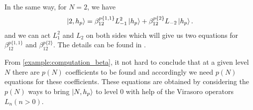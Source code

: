 \documentclass[10pt]{article}
\begin{document}
\begin{example}
    In the same way, for $N=2$, we have 
    \begin{align}
        \ket{2,h_p}=\beta^{p\{1,1\}}_{12} L^2_{-1}\ket{h_p}+\beta^{p\{2\}}_{12}L_{-2}\ket{h_p}.
    \end{align}
    and we can act $L_1^2$ and $L_2$ on both sides which will give us two equations for $\beta^{p\{1,1\}}_{12}$ and $\beta^{p\{2\}}_{12}$. 
    The details can be found in \cite{DiFrancesco:1997nk}.
\end{example}
From \cref{example:computation_beta}, it not hard to conclude that at a given level $N$ there are $p(N)$ coefficients to be found and accordingly we need $p(N)$ equations for these coefficients.
These equations are obtained by considering the $p(N)$ ways to bring $\ket{N,h_p}$ to level 0 with help of the Virasoro operators $L_n (n>0)$. 
\end{document}
